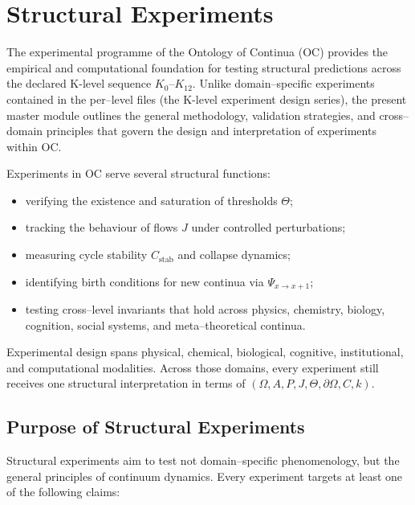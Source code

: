 
\section{Structural Experiments}
\label{sec:experiments-master}

The experimental programme of the Ontology of Continua (OC) provides the
empirical and computational foundation for testing structural predictions
across the declared K-level sequence $K_0$–$K_{12}$.
Unlike domain–specific experiments contained in the per–level files
(the K-level experiment design series), the present master module outlines the
general methodology, validation strategies, and cross–domain principles
that govern the design and interpretation of experiments within OC.

Experiments in OC serve several structural functions:
\begin{itemize}
    \item verifying the existence and saturation of thresholds $\Theta$;
    \item tracking the behaviour of flows $J$ under controlled perturbations;
    \item measuring cycle stability $C_{\mathrm{stab}}$ and collapse dynamics;
    \item identifying birth conditions for new continua via $\Psi_{x\to x+1}$;
    \item testing cross–level invariants that hold across physics, chemistry,
          biology, cognition, social systems, and meta–theoretical continua.
\end{itemize}

Experimental design spans physical, chemical, biological, cognitive,
institutional, and computational modalities. Across those domains, every
experiment still receives one structural interpretation in terms of
$(\Omega, A, P, J, \Theta, \partial\Omega, C, k)$.


\subsection{Purpose of Structural Experiments}

Structural experiments aim to test not domain–specific phenomenology, but the
general principles of continuum dynamics.
Every experiment targets at least one of the following claims:

